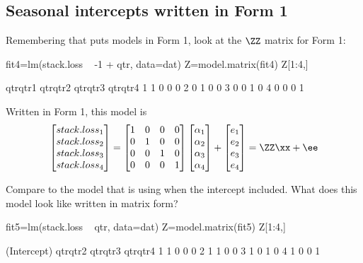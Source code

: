 \subsection{Seasonal intercepts written in Form 1}
Remembering that \verb@lm@ puts models in Form 1, look at the $\ZZ$ matrix for Form 1:
\begin{Schunk}
\begin{Sinput}
 fit4=lm(stack.loss ~ -1 + qtr, data=dat)
 Z=model.matrix(fit4)
 Z[1:4,]
\end{Sinput}
\begin{Soutput}
  qtrqtr1 qtrqtr2 qtrqtr3 qtrqtr4
1       1       0       0       0
2       0       1       0       0
3       0       0       1       0
4       0       0       0       1
\end{Soutput}
\end{Schunk}

Written in Form 1, this model is
\begin{equation}\label{eqn:stackloss.form1.season}
\begin{bmatrix}stack.loss_1\\ stack.loss_2\\ stack.loss_3\\ stack.loss_4\end{bmatrix}
= 
\begin{bmatrix}1&0&0&0\\ 0&1&0&0 \\ 0&0&1&0\\ 0&0&0&1\end{bmatrix}
\begin{bmatrix}\alpha_1 \\ \alpha_2 \\ \alpha_3 \\ \alpha_4 \end{bmatrix}
+
\begin{bmatrix}e_1\\e_2\\e_3\\e_4\end{bmatrix}=\ZZ\xx+\ee
\end{equation}


Compare to the model that \verb@lm@ is using when the intercept included.  What does this model look like written in matrix form?
\begin{Schunk}
\begin{Sinput}
 fit5=lm(stack.loss ~ qtr, data=dat)
 Z=model.matrix(fit5)
 Z[1:4,]
\end{Sinput}
\begin{Soutput}
  (Intercept) qtrqtr2 qtrqtr3 qtrqtr4
1           1       0       0       0
2           1       1       0       0
3           1       0       1       0
4           1       0       0       1
\end{Soutput}
\end{Schunk}

